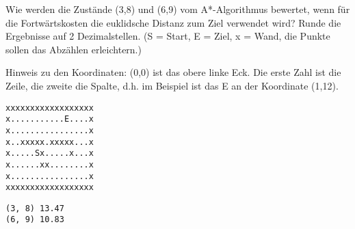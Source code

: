 \question[2]
Wie werden die Zustände (3,8) und (6,9) vom A*-Algorithmus
bewertet, wenn für die Fortwärtskosten die euklidsche Distanz zum Ziel verwendet
wird? Runde die Ergebnisse auf 2 Dezimalstellen.
(S = Start, E = Ziel, x = Wand, die Punkte sollen das Abzählen erleichtern.)

Hinweis zu den Koordinaten: (0,0) ist das obere linke Eck. Die erste Zahl
ist die Zeile, die zweite die Spalte, d.h. im Beispiel ist das E an der Koordinate (1,12).
\begin{lstlisting}
xxxxxxxxxxxxxxxxxx
x...........E....x
x................x
x..xxxxx.xxxxx...x
x.....Sx.....x...x
x......xx........x
x................x
xxxxxxxxxxxxxxxxxx
\end{lstlisting}
\begin{solutionbox}{2cm}
\begin{lstlisting}
(3, 8) 13.47
(6, 9) 10.83
\end{lstlisting}
\end{solutionbox}
